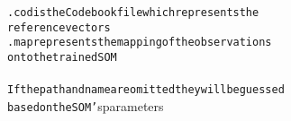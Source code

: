 {{\begin{tabbing}
{\texttt{\hspace{72pt}.cod\hspace{6pt}is\hspace{6pt}the\hspace{6pt}Codebook\hspace{6pt}file\hspace{6pt}which\hspace{6pt}represents\hspace{6pt}the}}\\
{\texttt{\hspace{96pt}reference\hspace{6pt}vectors}}\\
{\texttt{\hspace{72pt}.map\hspace{6pt}represents\hspace{6pt}the\hspace{6pt}mapping\hspace{6pt}of\hspace{6pt}the\hspace{6pt}observations}}\\
{\texttt{\hspace{96pt}onto\hspace{6pt}the\hspace{6pt}trained\hspace{6pt}SOM}}\\
{\texttt{\hspace{72pt}}}\\
{\texttt{\hspace{72pt}If\hspace{6pt}the\hspace{6pt}path\hspace{6pt}and\hspace{6pt}name\hspace{6pt}are\hspace{6pt}omitted\hspace{6pt}they\hspace{6pt}will\hspace{6pt}be\hspace{6pt}guessed\hspace{6pt}}}\\
{\texttt{\hspace{72pt}based\hspace{6pt}on\hspace{6pt}the\hspace{6pt}SOM{'}}}s\hspace{6pt}parameters\\
\\

\end{tabbing}}}
